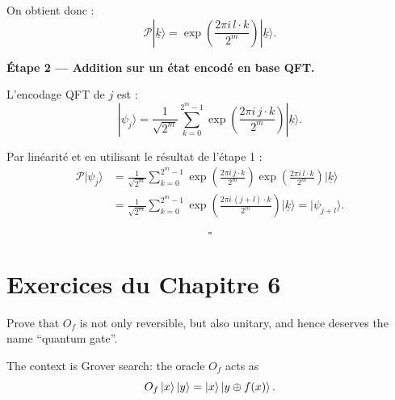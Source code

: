 \documentclass{ceri/sty/rapport}
\newcounter{exercice}[section]
\begin{document}
\begin{demonstration}
On obtient donc :
\[
  \mathcal{P}|\underline{k}\rangle
  = \exp\!\left(\frac{2\pi i\, l\cdot k}{2^m}\right)|\underline{k}\rangle.
\]

\medskip
\noindent\textbf{Étape 2 — Addition sur un état encodé en base QFT.}

\smallskip
L'encodage QFT de $j$ est :
\[
  |\psi_j\rangle
  = \frac{1}{\sqrt{2^m}} \sum_{k=0}^{2^m-1}
    \exp\!\left(\frac{2\pi i\, j\cdot k}{2^m}\right) |\underline{k}\rangle.
\]

Par linéarité et en utilisant le résultat de l'étape 1 :
\begin{align*}
\mathcal{P}|\psi_j\rangle
  &= \frac{1}{\sqrt{2^m}} \sum_{k=0}^{2^m-1}
       \exp\!\left(\frac{2\pi i\, j\cdot k}{2^m}\right)
       \exp\!\left(\frac{2\pi i\, l\cdot k}{2^m}\right) |\underline{k}\rangle \\
  &= \frac{1}{\sqrt{2^m}} \sum_{k=0}^{2^m-1}
       \exp\!\left(\frac{2\pi i\,(j+l)\cdot k}{2^m}\right) |\underline{k}\rangle
   = |\psi_{j+l}\rangle.
\end{align*}

\[
  \square
\]

\end{demonstration}

\bigskip

\setcounter{section}{5}
\section{Exercices du Chapitre 6}
\label{sec:chap6}

\begin{exercice}
Prove that $O_f$ is not only reversible, but also unitary, and hence deserves the name “quantum gate”.

The context is Grover search: the oracle $O_f$ acts as
\[ O_f\ket{x}\ket{y} = \ket{x}\ket{y\oplus f(x)}. \]
\end{exercice}
\end{document}
